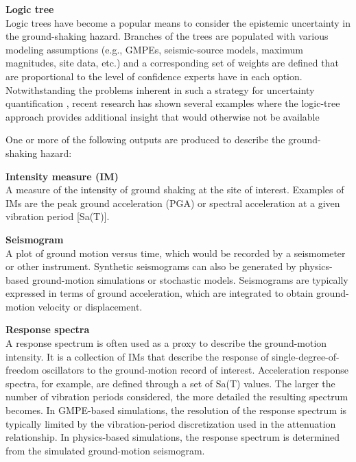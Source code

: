 \noindent\textbf{Logic tree} \\Logic trees have become a popular means to consider the epistemic uncertainty in the ground-shaking hazard. Branches of the trees are populated with various modeling assumptions (e.g., GMPEs, seismic-source models, maximum magnitudes, site data, etc.) and a corresponding set of weights are defined that are proportional to the level of confidence experts have in each option. Notwithstanding the problems inherent in such a strategy for uncertainty quantification \citep{bommer2008use}, recent research has shown several examples where the logic-tree approach provides additional insight that would otherwise not be available \citep[see e.g.][]{goulet2017ngaeast}
\newline

\noindent One or more of the following outputs are produced to describe the ground-shaking hazard:
\newline

\noindent\textbf{Intensity measure (IM)} \\A measure of the intensity of ground shaking at the site of interest. Examples of IMs are the peak ground acceleration (PGA) or spectral acceleration at a given vibration period [Sa(T)].
\newline

\noindent\textbf{Seismogram } \\A plot of ground motion versus time, which would be recorded by a seismometer or other instrument. Synthetic seismograms can also be generated by physics-based ground-motion simulations or stochastic models. Seismograms are typically expressed in terms of ground acceleration, which are integrated to obtain ground-motion velocity or displacement. 
\newline

\noindent\textbf{Response spectra} \\A response spectrum is often used as a proxy to describe the ground-motion intensity. It is a collection of IMs that describe the response of single-degree-of-freedom oscillators to the ground-motion record of interest. Acceleration response spectra, for example, are defined through a set of Sa(T) values. The larger the number of vibration periods considered, the more detailed the resulting spectrum becomes. In GMPE-based simulations, the resolution of the response spectrum is typically limited by the vibration-period discretization used in the attenuation relationship. In physics-based simulations, the response spectrum is determined from the simulated ground-motion seismogram.
\newline


